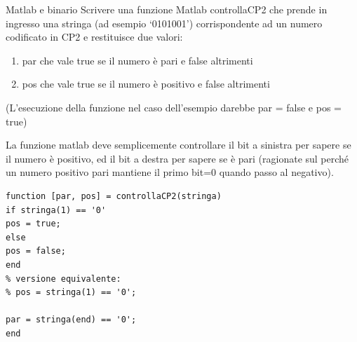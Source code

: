 \documentclass[format=169, 10pt]{beamer}
\begin{document}
\iffalse
\begin{frame}[fragile]{Matlab e binario}
\framebreak
Scrivere  una  funzione  Matlab  controllaCP2  che  prende  in  ingresso  una  stringa  (ad  
esempio ‘0101001’)  corrispondente  ad  un  numero  codificato  in  CP2  e  restituisce  due  
valori: 
\begin{enumerate}
	\item par  che  vale  true  se  il  numero  è  pari  e  false  altrimenti  
	\item    pos  che  vale  true  se  il  numero  è  positivo  e  false  altrimenti  
\end{enumerate}
(L’esecuzione  della  funzione  nel  caso  dell’esempio  darebbe  par = false  e  pos =
true)


\framebreak

La funzione matlab deve semplicemente controllare il bit a sinistra per sapere se il numero è positivo, ed il bit a destra per sapere se è pari (ragionate sul perché un numero positivo pari mantiene il primo bit=0 quando passo al negativo).
\begin{lstlisting}[style=matlab]
function [par, pos] = controllaCP2(stringa)
if stringa(1) == '0'
pos = true;
else
pos = false;
end
% versione equivalente:
% pos = stringa(1) == '0';

par = stringa(end) == '0';
end
\end{lstlisting}


\end{frame}
\end{document}
